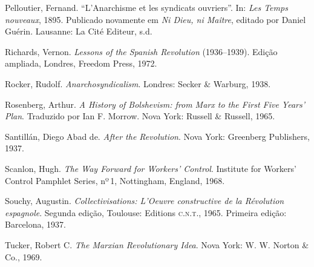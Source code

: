{Pelloutier}, Fernand. “L’Anarchisme et les syndicats ouvriers”.
In: \textit{Les Temps nouveaux}, 1895. Publicado novamente em \textit{Ni
Dieu, ni Maître}, editado por Daniel Guérin. Lausanne: La Cité
Editeur, s.d.

{Richards}, Vernon. \textit{Lessons of the Spanish Revolution}
(1936--1939). Edição ampliada, Londres, Freedom Press, 1972.

{Rocker}, Rudolf. \textit{Anarchosyndicalism}. Londres: Secker \&
Warburg, 1938.

{Rosenberg}, Arthur. \textit{A History of Bolshevism: from Marx to the
First Five Years’ Plan}. Traduzido por Ian F. Morrow. Nova York:
Russell \& Russell, 1965.

{Santillán}, Diego Abad de. \textit{After the Revolution}. Nova York:
Greenberg Publishers, 1937.

{Scanlon}, Hugh. \textit{The Way Forward for Workers’ Control}.
Institute for Workers’ Control Pamphlet Series, nº\,1, Nottingham, England, 1968.

{Souchy}, Augustin. \textit{Collectivisations: L’Oeuvre constructive de la Révolution
espagnole}. Segunda edição, Toulouse: Editions \textsc{c.n.t.}, 1965. Primeira
edição: Barcelona, 1937.

{Tucker}, Robert C. \textit{The Marxian Revolutionary Idea}. Nova York:
W. W. Norton \& Co., 1969.
